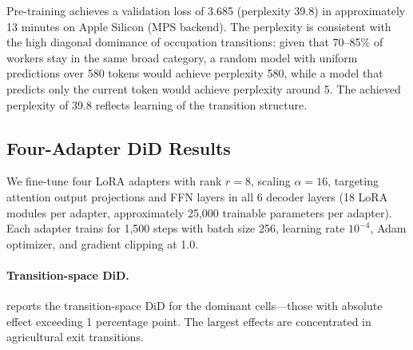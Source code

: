 \documentclass[12pt]{article}
\begin{document}
Pre-training achieves a validation loss of 3.685 (perplexity 39.8) in approximately 13 minutes on Apple Silicon (MPS backend). The perplexity is consistent with the high diagonal dominance of occupation transitions: given that 70--85\% of workers stay in the same broad category, a random model with uniform predictions over 580 tokens would achieve perplexity 580, while a model that predicts only the current token would achieve perplexity around 5. The achieved perplexity of 39.8 reflects learning of the transition structure.

\subsection{Four-Adapter DiD Results}

We fine-tune four LoRA adapters with rank $r = 8$, scaling $\alpha = 16$, targeting attention output projections and FFN layers in all 6 decoder layers (18 LoRA modules per adapter, approximately 25,000 trainable parameters per adapter). Each adapter trains for 1,500 steps with batch size 256, learning rate $10^{-4}$, Adam optimizer, and gradient clipping at 1.0.

\paragraph{Transition-space DiD.}  reports the transition-space DiD for the dominant cells---those with absolute effect exceeding 1 percentage point. The largest effects are concentrated in agricultural exit transitions.
\end{document}
